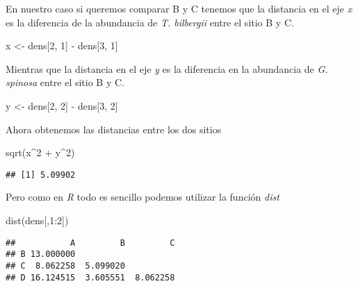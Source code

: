 \documentclass[
]{article}
\newenvironment{Shaded}{\begin{snugshade}}{\end{snugshade}}
\newcommand{\DecValTok}[1]{\textcolor[rgb]{0.00,0.00,0.81}{#1}}
\newcommand{\FunctionTok}[1]{\textcolor[rgb]{0.00,0.00,0.00}{#1}}
\newcommand{\NormalTok}[1]{#1}
\newcommand{\OtherTok}[1]{\textcolor[rgb]{0.56,0.35,0.01}{#1}}
\newcommand{\SpecialCharTok}[1]{\textcolor[rgb]{0.00,0.00,0.00}{#1}}
\begin{document}
En nuestro caso si queremos comparar B y C tenemos que la distancia en el eje \emph{x} es la diferencia de la abundancia de \emph{T. bilbergii} entre el sitio B y C.

\begin{Shaded}
\begin{Highlighting}[]
\NormalTok{x }\OtherTok{\textless{}{-}}\NormalTok{ dens[}\DecValTok{2}\NormalTok{, }\DecValTok{1}\NormalTok{] }\SpecialCharTok{{-}}\NormalTok{ dens[}\DecValTok{3}\NormalTok{, }\DecValTok{1}\NormalTok{]}
\end{Highlighting}
\end{Shaded}

Mientras que la distancia en el eje \emph{y} es la diferencia en la abundancia de \emph{G. spinosa} entre el sitio B y C.

\begin{Shaded}
\begin{Highlighting}[]
\NormalTok{y }\OtherTok{\textless{}{-}}\NormalTok{ dens[}\DecValTok{2}\NormalTok{, }\DecValTok{2}\NormalTok{] }\SpecialCharTok{{-}}\NormalTok{ dens[}\DecValTok{3}\NormalTok{, }\DecValTok{2}\NormalTok{]}
\end{Highlighting}
\end{Shaded}

Ahora obtenemos las distancias entre los dos sitios

\begin{Shaded}
\begin{Highlighting}[]
\FunctionTok{sqrt}\NormalTok{(x}\SpecialCharTok{\^{}}\DecValTok{2} \SpecialCharTok{+}\NormalTok{ y}\SpecialCharTok{\^{}}\DecValTok{2}\NormalTok{)}
\end{Highlighting}
\end{Shaded}

\begin{verbatim}
## [1] 5.09902
\end{verbatim}

Pero como en \emph{R} todo es sencillo podemos utilizar la función \emph{dist}

\begin{Shaded}
\begin{Highlighting}[]
\FunctionTok{dist}\NormalTok{(dens[,}\DecValTok{1}\SpecialCharTok{:}\DecValTok{2}\NormalTok{])}
\end{Highlighting}
\end{Shaded}

\begin{verbatim}
##           A         B         C
## B 13.000000                    
## C  8.062258  5.099020          
## D 16.124515  3.605551  8.062258
\end{verbatim}
\end{document}
